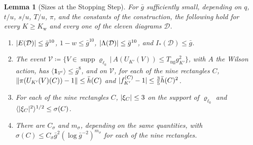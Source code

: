\documentclass[11pt]{preprint}
\DeclarePairedDelimiter{\abs}{\lvert}{\rvert}
\DeclarePairedDelimiter{\norm}{\lVert}{\rVert}
\numberwithin{equation}{section}
\newtheorem{lemma}[theorem]{Lemma}
\theoremstyle{definition}
\theoremstyle{remark}
\theoremstyle{plain}
\begin{document}
\begin{lemma}[Sizes at the Stopping Step]\label{lem:stopping-sizes}
For $\bar g$ sufficiently small, depending on $q$, $t/u$, $s/u$, $T/u$, $\pi$, and the constants of the construction, the following hold for every $K \geq K_{\mathrm w}$ and every one of the eleven diagrams $\mathcal D$.
\begin{enumerate}[label=(\roman*)]
\item $\abs{E(\mathcal D)} \leq \bar g^{10}$, $1 - w \leq \bar g^{10}$, $\abs{\Lambda(\mathcal D)} \leq \bar g^{10}$, and $I_*(\mathcal D) \leq \bar g$.
\item The event $\mathcal V \coloneqq \{ V \in \operatorname{supp}\varrho_{\ell_0} \,|\, A(U_{K'}(V)) \leq T_{\mathrm{ng}}g_{K'}^2 \}$, with $A$ the Wilson action, has $\langle\mathbf 1_{\mathcal V^c}\rangle \leq \bar g^8$, and on $\mathcal V$, for each of the nine rectangles $C$, $\norm{\pi(U_{K'}(V)(C)) - 1} \leq \bar h(C)$ and $\abs{f^{(C)}_{K'} - 1} \leq \frac35\bar h(C)^2$.
\item For each of the nine rectangles $C$, $\abs{\xi_C} \leq 3$ on the support of $\varrho_{\ell_0}$ and $\langle\abs{\xi_C}^2\rangle^{1/2} \leq \sigma(C)$.
\item There are $C_\sigma$ and $m_\sigma$, depending on the same quantities, with $\sigma(C) \leq C_\sigma\bar g^2(\log\bar g^{-2})^{m_\sigma}$ for each of the nine rectangles.
\end{enumerate}
\end{lemma}
\end{document}
